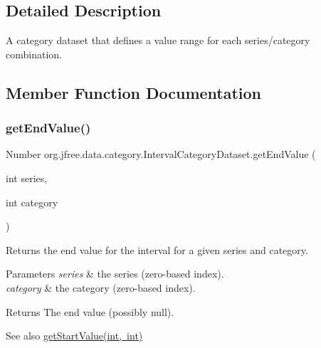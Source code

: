 \subsection{Detailed Description}
A category dataset that defines a value range for each series/category combination. 

\subsection{Member Function Documentation}
\mbox{\label{interfaceorg_1_1jfree_1_1data_1_1category_1_1_interval_category_dataset_af83cb9f655ea175391fed773b2e478cb}} 
\subsubsection{\texorpdfstring{get\+End\+Value()}{getEndValue()}\hspace{0.1cm}{\footnotesize\ttfamily [1/2]}}
{\footnotesize\ttfamily Number org.\+jfree.\+data.\+category.\+Interval\+Category\+Dataset.\+get\+End\+Value (\begin{DoxyParamCaption}\item[{int}]{series,  }\item[{int}]{category }\end{DoxyParamCaption})}

Returns the end value for the interval for a given series and category.


\begin{DoxyParams}{Parameters}
{\em series} & the series (zero-\/based index). \\
\hline
{\em category} & the category (zero-\/based index).\\
\hline
\end{DoxyParams}
\begin{DoxyReturn}{Returns}
The end value (possibly {\ttfamily null}).
\end{DoxyReturn}
\begin{DoxySeeAlso}{See also}
\mbox{\hyperlink{interfaceorg_1_1jfree_1_1data_1_1category_1_1_interval_category_dataset_ab39752773cf77a5ccbbae7851fd16aa6}{get\+Start\+Value(int, int)}} 
\end{DoxySeeAlso}


